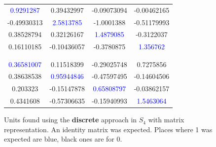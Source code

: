\begin{figure}
\center
\caption{Units found using the \textbf{discrete} approach in $S_4$ with matrix representation. An identity matrix was expected. Places where 1 was expected are blue, black ones are for 0.}
\label{table:s4_matrix_unit}
\begin{tabular}{cccc}
\textcolor{blue}{0.9291287} & 0.39432997 & -0.09073094 & -0.00462165\\
-0.49930313 & \textcolor{blue}{2.5813785} & -1.0001388 & -0.51179993\\
0.38528794 & 0.32126167 & \textcolor{blue}{1.4879085} & -0.3122037\\
0.16110185 & -0.10436057 & -0.3780875 & \textcolor{blue}{1.356762}\\
 \\
\hline
\\
 \textcolor{blue}{0.36581007} & 0.11518399 & -0.29025748  & 0.7275856\\
0.38638538 & \textcolor{blue}{0.95944846} & -0.47597495 & -0.14604506\\
0.203323 & -0.15147878 & \textcolor{blue}{0.65808797} & -0.03862157\\
0.4341608 & -0.57306635 & -0.15940993 & \textcolor{blue}{1.5463064}
\end{tabular}
\end{figure}

